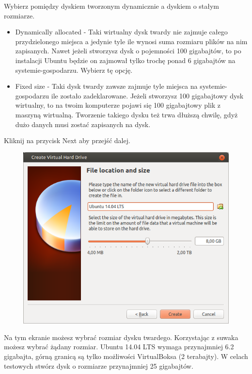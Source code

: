 Wybierz pomiędzy dyskiem tworzonym dynamicznie a dyskiem o stałym rozmiarze.
\begin{itemize}
\item \textcolor{ubuntu_orange}{Dynamically allocated} - Taki wirtualny dysk twardy nie zajmuje całego przydzielonego miejsca a jedynie tyle ile wynosi suma rozmiaru plików na nim zapisanych. Nawet jeżeli stworzysz dysk o pojemności 100 gigabajtów, to po instalacji Ubuntu będzie on zajmował tylko trochę ponad 6 gigabajtów na systemie-gospodarzu. Wybierz tę opcję.
\item \textcolor{ubuntu_orange}{Fixed size} - Taki dysk twardy zawsze zajmuje tyle miejsca na systemie-gospodarzu ile zostało zadeklarowane. Jeżeli stworzysz 100 gigabajtowy dysk wirtualny, to na twoim komputerze pojawi się 100 gigabajtowy plik z maszyną wirtualną. Tworzenie takiego dysku też trwa dłuższą chwilę, gdyż dużo danych musi zostać zapisanych na dysk.
\end{itemize}
\begin{flushright}
Kliknij na przycisk \textcolor{ubuntu_orange}{Next} aby przejść dalej.
\end{flushright}

\begin{figure}
	\vspace{-10pt}
	\includegraphics[width=\linewidth]{images/virtualbox_wizard6.png}
\end{figure}

Na tym ekranie możesz wybrać rozmiar dysku twardego. Korzystając z suwaka możesz wybrać żądany rozmiar. Ubuntu 14.04 LTS wymaga przynajmniej 6.2 gigabajta, górną granicą są tylko możliwości VirtualBoksa (2 terabajty). W celach testowych stwórz dysk o rozmiarze przynajmniej 25 gigabajtów.

